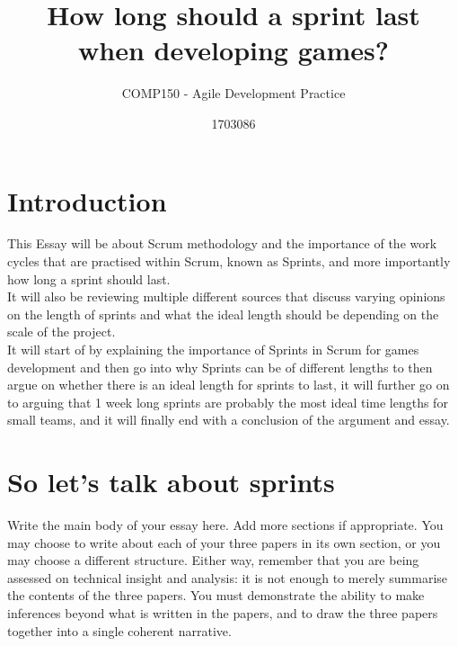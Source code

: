 \documentclass{scrartcl}
\title{How long should a sprint last\\when developing games?}
\subtitle{COMP150 - Agile Development Practice}
\author{1703086}
\begin{document}
\maketitle


\section{Introduction}
\iffalse
Write your introduction here. A brief introduction is recommended, which should outline key details of the chosen topic and the reviewed papers, motivate the work, and provide a roadmap of key points to the reader. The motivation is quite important here, as essays should have a contribution (i.e., what is the point of the essay, and what does the reader take away from the essay) and the link between the motivation (in the introduction) and the contribution (in the conclusion) should be made clear.
\fi
This Essay will be about Scrum methodology and the importance of the work cycles that are practised within Scrum, known as Sprints, and more importantly how long a sprint should last.\\
It will also be reviewing multiple different sources that discuss varying opinions on the length of sprints and what the ideal length should be depending on the scale of the project.\\
It will start of by explaining the importance of Sprints in Scrum for games development and then go into why Sprints can be of different lengths to then argue on whether there is an ideal length for sprints to last, it will further go on to arguing that 1 week long sprints are probably the most ideal time lengths for small teams, and it will finally end with a conclusion of the argument and essay.


\section{So let's talk about sprints}
\iffalse
Write the main body of your essay here. Add more sections if appropriate. You may choose to write about each of your three papers in its own section, or you may choose a different structure. Either way, remember that you are being assessed on technical insight and analysis: it is not enough to merely summarise the contents of the three papers. You must demonstrate the ability to make inferences beyond what is written in the papers, and to draw the three papers together into a single coherent narrative.
\end{document}
